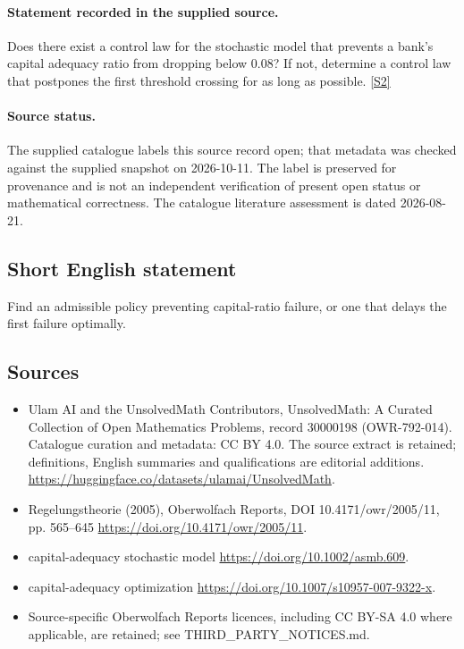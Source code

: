 \documentclass[11pt]{article}
\begin{document}
\paragraph{Statement recorded in the supplied source.}
Does there exist a control law for the stochastic model that prevents a bank's capital adequacy ratio from dropping below $0.08$? If not, determine a control law that postpones the first threshold crossing for as long as possible. \href{https://doi.org/10.4171/owr/2005/11}{[S2]}
\paragraph{Source status.}
The supplied catalogue labels this source record open; that metadata was checked against the supplied snapshot on 2026-10-11. The label is preserved for provenance and is not an independent verification of present open status or mathematical correctness. The catalogue literature assessment is dated 2026-08-21.
\subsection{Short English statement}
Find an admissible policy preventing capital-ratio failure, or one that delays the first failure optimally.
\subsection{Sources}
\begin{itemize}
\item[S1] Ulam AI and the UnsolvedMath Contributors, UnsolvedMath: A Curated Collection of Open Mathematics Problems, record 30000198 (OWR-792-014). Catalogue curation and metadata: CC BY 4.0. The source extract is retained; definitions, English summaries and qualifications are editorial additions.
\url{https://huggingface.co/datasets/ulamai/UnsolvedMath}.
\item[S2] Regelungstheorie (2005), Oberwolfach Reports, DOI 10.4171/owr/2005/11, pp. 565--645
\url{https://doi.org/10.4171/owr/2005/11}.
\item[S3] capital-adequacy stochastic model
\url{https://doi.org/10.1002/asmb.609}.
\item[S4] capital-adequacy optimization
\url{https://doi.org/10.1007/s10957-007-9322-x}.
\item Source-specific Oberwolfach Reports licences, including CC BY-SA 4.0 where applicable, are retained; see THIRD\_PARTY\_NOTICES.md.
\end{itemize}
\end{document}
